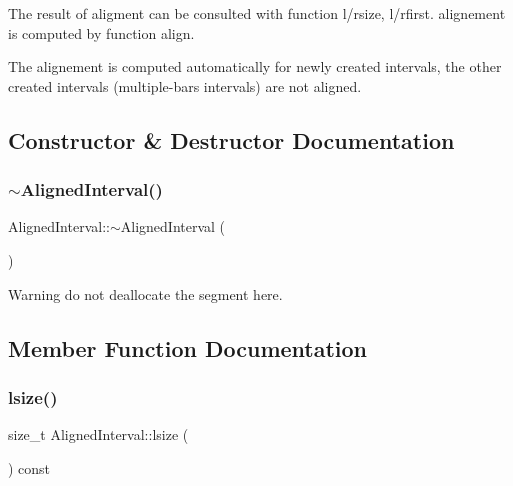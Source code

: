 The result of aligment can be consulted with function l/rsize, l/rfirst. alignement is computed by function align.

The alignement is computed automatically for newly created intervals, the other created intervals (multiple-\/bars intervals) are not aligned. 

\subsection{Constructor \& Destructor Documentation}
\mbox{\label{classAlignedInterval_ae327b28af603aaffbe9bc8480c6e2109}} 
\subsubsection{\texorpdfstring{$\sim$AlignedInterval()}{~AlignedInterval()}}
{\footnotesize\ttfamily Aligned\+Interval\+::$\sim$\+Aligned\+Interval (\begin{DoxyParamCaption}{ }\end{DoxyParamCaption})\hspace{0.3cm}{\ttfamily [inline]}}

\begin{DoxyWarning}{Warning}
do not deallocate the segment here. 
\end{DoxyWarning}


\subsection{Member Function Documentation}
\mbox{\label{classAlignedInterval_a260f8eead747a05642d7b5d720d02e5b}} 
\subsubsection{\texorpdfstring{lsize()}{lsize()}}
{\footnotesize\ttfamily size\+\_\+t Aligned\+Interval\+::lsize (\begin{DoxyParamCaption}{ }\end{DoxyParamCaption}) const\hspace{0.3cm}{\ttfamily [inline]}}



